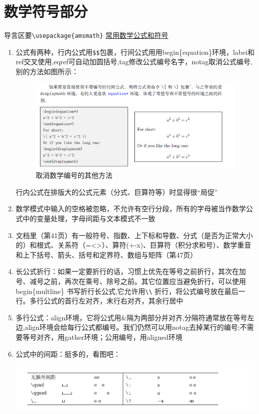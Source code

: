 \documentclass{article}
\begin{document}
\section{数学符号部分}
导言区要\verb|\usepackage{amsmath}|
\href{https://zhuanlan.zhihu.com/p/464237097}{常用数学公式和符号}
\begin{enumerate}
	\item 公式有两种，行内公式用\verb|$$|包裹，行间公式用用begin\{equation\}环境，labei和ref交叉使用,eqref可自动加圆括号,tag修改公式编号名字，notag取消公式编号,别的方法如图所示：
	
\begin{figure}
\centering
\includegraphics[width=\textwidth]{引用.png}
\caption{取消数学编号的其他方法}
\end{figure}

行内公式在排版大的公式元素（分式、巨算符等）时显得很“局促”

\item 数学模式中输入的空格被忽略，不允许有空行分段，所有的字母被当作数学公式中的变量处理，字母间距与文本模式不一致
\item 文档里（第41页）有一般符号、指数、上下标和导数、分式（是否为正常大小的）和根式、关系符（=<>）、算符(+-x)、巨算符（积分求和号）、数学重音和上下括号、箭头、括号和定界符、数组与矩阵（第47页）
\item 长公式折行：如果一定要折行的话，习惯上优先在等号之前折行，其次在加号、减号之前，再次在乘号、除号之前。其它位置应当避免折行，可以使用begin\{multline\} 书写折行长公式,它允许用\verb|\\| 折行，将公式编号放在最后一行。多行公式的首行左对齐，末行右对齐，其余行居中
\item 多行公式：align环境，它将公式用\&隔为两部分并对齐,分隔符通常放在等号左边,align环境会给每行公式都编号。我们仍然可以用notag去掉某行的编号;不需要等号对齐，用gather环境；公用编号，用aligned环境
\item 公式中的间距：挺多的，看图吧：

\includegraphics[width=\textwidth]{间距.png}


\end{enumerate}
\end{document}
